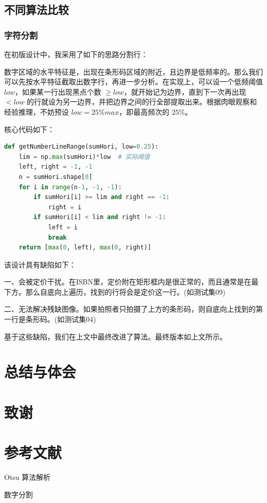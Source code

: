 \documentclass{ctexart}
\begin{document}
\subsection{不同算法比较}
\subsubsection{字符分割}
在初版设计中，我采用了如下的思路分割行：

数字区域的水平特征是，出现在条形码区域的附近，且边界是低频率的。那么我们可以先按水平特征截取出数字行，再进一步分析。在实现上，可以设一个低频阈值 $low$，如果某一行出现黑点个数 $\ge low$，就开始记为边界，直到下一次再出现 $< low$ 的行就设为另一边界，并把边界之间的行全部提取出来。根据肉眼观察和经验推理，不妨预设 $low=25\%max$，即最高频次的 $25\%$。

核心代码如下：
\begin{lstlisting}[language=python]
def getNumberLineRange(sumHori, low=0.25):
    lim = np.max(sumHori)*low  # 实际阈值
    left, right = -1, -1
    n = sumHori.shape[0]
    for i in range(n-1, -1, -1):
        if sumHori[i] >= lim and right == -1:
            right = i
        if sumHori[i] < lim and right != -1:
            left = i
            break
    return [max(0, left), max(0, right)]
\end{lstlisting}

该设计具有缺陷如下：

一、会被定价干扰。在ISBN里，定价附在矩形框内是很正常的，而且通常是在最下方。那么自底向上遍历，找到的行将会是定价这一行。(如测试集09)

二、无法解决残缺图像。如果拍照者只拍摄了上方的条形码，则自底向上找到的第一行是条形码。(如测试集04)

基于这些缺陷，我们在上文中最终改进了算法。最终版本如上文所示。

\section{总结与体会}
\section{致谢}
\section{参考文献}
Otsu 算法解析

数字分割
\end{document}

